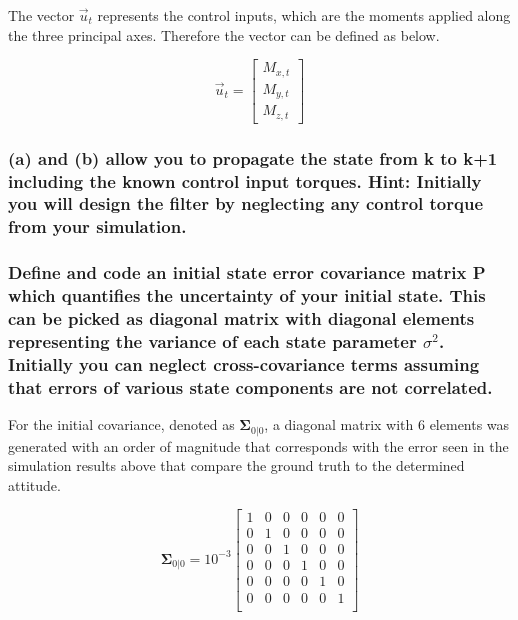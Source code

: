 The vector $\vec{u}_t$ represents the control inputs, which are the moments applied along the three principal axes. Therefore the vector can be defined as below.

\begin{equation*}
    \vec{u}_t = \begin{bmatrix}
        M_{x,t} \\ M_{y,t} \\ M_{z,t}
    \end{bmatrix}
\end{equation*}

\subsubsection{(a) and (b) allow you to propagate the state from k to k+1 including the known control input torques. Hint: Initially you will design the filter by neglecting any control torque from your simulation.}

\subsubsection{Define and code an initial state error covariance matrix P which quantifies the uncertainty of your initial state. This can be picked as diagonal matrix with diagonal elements representing the variance of each state parameter $\sigma ^2$. Initially you can neglect cross-covariance terms assuming that errors of various state components are not correlated.}

For the initial covariance, denoted as $\boldsymbol{\Sigma}_{0 \vert 0}$, a diagonal matrix with 6 elements was generated with an order of magnitude that corresponds with the error seen in the simulation results above that compare the ground truth to the determined attitude.

\begin{equation*}
    \boldsymbol{\Sigma}_{0 \vert 0} = 10^{-3} \begin{bmatrix}
        1 & 0 & 0 & 0 & 0 & 0 \\
        0 & 1 & 0 & 0 & 0 & 0 \\
        0 & 0 & 1 & 0 & 0 & 0 \\
        0 & 0 & 0 & 1 & 0 & 0 \\
        0 & 0 & 0 & 0 & 1 & 0 \\
        0 & 0 & 0 & 0 & 0 & 1 \\
    \end{bmatrix}
\end{equation*}

